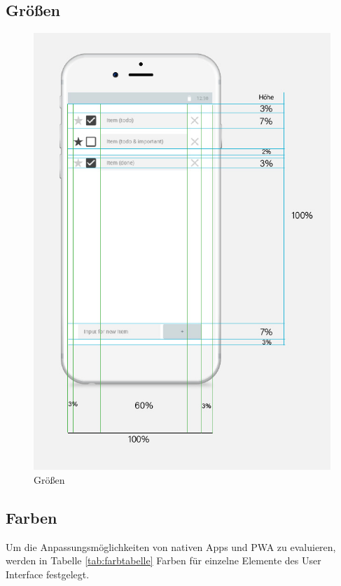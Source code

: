 \subsection{Größen}
\begin{figure}[h]
        \includegraphics[scale=0.5]{img/Wireframe_dimensions.jpg}
        \centering
        \caption{Größen}
        \label{fig:dimensions}
\end{figure}

\subsection{Farben}

Um die Anpassungsmöglichkeiten von nativen Apps und PWA zu evaluieren, werden in Tabelle \ref{tab:farbtabelle} Farben für einzelne Elemente des User Interface festgelegt.

